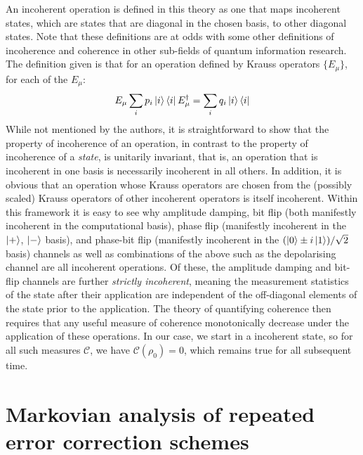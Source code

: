 \documentclass{report}
\begin{document}
\begin{appendices}
An incoherent operation is defined in this theory as one that maps incoherent states, which are states that are diagonal in the chosen basis, to other diagonal states. Note that these definitions are at odds with some other definitions of incoherence and coherence in other sub-fields of quantum information research. The definition given is that for an operation defined by Krauss operators $\{E_\mu\}$, for each of the $E_\mu$:
\begin{equation*}
    E_\mu \sum_i p_i \ket{i}\bra{i} E_\mu^\dag = \sum_i q_i \ket{i}\bra{i}
\end{equation*}
While not mentioned by the authors, it is straightforward to show that the property of incoherence of an operation, in contrast to the property of incoherence of a \textit{state}, is unitarily invariant, that is, an operation that is incoherent in one basis is necessarily incoherent in all others. In addition, it is obvious that an operation whose Krauss operators are chosen from the (possibly scaled) Krauss operators of other incoherent operators is itself incoherent. Within this framework it is easy to see why amplitude damping, bit flip (both manifestly incoherent in the computational basis), phase flip (manifestly incoherent in the $\ket{+}$, $\ket{-}$ basis), and phase-bit flip (manifestly incoherent in the $(\ket{0} \pm i\ket{1})/\sqrt{2}$ basis) channels as well as combinations of the above such as the depolarising channel are all incoherent operations. Of these, the amplitude damping and bit-flip channels are further \textit{strictly incoherent}, meaning the measurement statistics of the state after their application are independent of the off-diagonal elements of the state prior to the application. The theory of quantifying coherence then requires that any useful measure of coherence monotonically decrease under the application of these operations. In our case, we start in a incoherent state, so for all such measures $\mathcal{C}$, we have $\mathcal{C}(\rho_0) = 0$, which remains true for all subsequent time.

\chapter{Markovian analysis of repeated error correction schemes}\label{appendix:markovanalysis}

\end{appendices}
\end{document}
